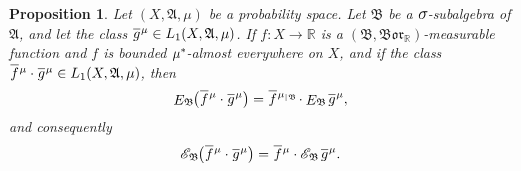 \documentclass[
twoside=true,
paper=letter,
fontsize=9pt,
pagesize=auto,
leqno,
openany,
headsepline,
overfullrule,
]{scrbook}
\theoremstyle{plain}
\theoremstyle{plain}
\newtheorem{prop}[thm]{Proposition}
\theoremstyle{definition}
\theoremstyle{bfnoteitalic}
\theoremstyle{bfnoteroman}
\newcommand{\sigalg}[1]{\mathfrak{#1}}
\newcommand{\cali}[1]{\mathscr{#1}}
\newcommand{\kondexpsub}[2]
{\mathop{E}\nolimits_{#2}\hspace{-1pt}#1}
\newcommand{\condexpsub}[2]
{\mathop{\cali{E}\hspace{-1.5pt}}\nolimits_{#2}\hspace{-1pt}#1}
\newcommand{\borel}{\mathfrak{Bor}}
\newcommand{\textsigma}{\hbox{\large{$\sigma$}}\kern-1pt}
\newcommand{\restrictedto}[1]{_{\lvert#1}\kern-1.5pt}
\newcommand{\R}{\mathbb{R}}
\newcommand{\sigmaalgebra}{\sigalg{A}}
\newcommand{\sigmaalgebraii}{\sigalg{B}}
\newcommand{\kernast}{\ast\kern-1pt}
\newcommand{\Pstar}{\measure^\kernast}
\newcommand{\function}{f}
\newcommand{\functionii}{g}
\newcommand{\measurespace}{X}
\newcommand{\measure}{\mu}
\newcommand*\xbar[1]{%
   \hbox{%
     \vbox{%
       \hrule height 0.4pt %
       \kern0.4ex%
       \hbox{%
         \ensuremath{#1}%
       }%
     }%
   }%
}
\newcommand{\lebclass}[1]{\hspace{.5pt}\xbar{#1}\hspace{0.5pt}}
\newcommand{\ellclass}[2]{\lebclass{#1}^{#2}}
\begin{document}
\begin{prop} \label{measurable_functions_factor_out}
Let $(\measurespace, \sigmaalgebra,\measure)$ be a probability space.
Let $\sigmaalgebraii$ be a $\textsigma$-subalgebra of $\sigmaalgebra$, and let the class
$\ellclass{\functionii}{\measure}
\in L_1(\measurespace, \sigmaalgebra,\measure)$.
If $\function:\measurespace\to\R$ is a
$(\sigmaalgebraii, \borel_\R)$\hyp{}measurable function and $\function$ is bounded 
$\Pstar$-almost everywhere on $\measurespace$,  and if the class
$\ellclass{\function}{\measure} \cdot \ellclass{\functionii}{\measure}
\in L_1(\measurespace, \sigmaalgebra,\measure)$, then
\[
\kondexpsub{\bigl(\ellclass{\function}{\measure} \cdot \ellclass{\functionii}{\measure}\bigr)}{\sigmaalgebraii}
= 
\ellclass{\function}{\measure\restrictedto{\sigmaalgebraii}}
\cdot
\kondexpsub{\ellclass{\functionii}{\measure}}{\sigmaalgebraii}
,\]
and consequently
\[
\condexpsub{\bigl(\ellclass{\function}{\measure} \cdot \ellclass{\functionii}{\measure}\bigr)}{\sigmaalgebraii}
= 
\ellclass{\function}{\measure}
\cdot
\condexpsub{\ellclass{\functionii}{\measure}}{\sigmaalgebraii}
.\]
\end{prop}
\end{document}
